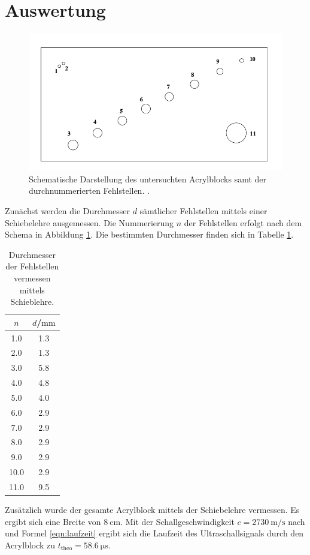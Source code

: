 \section{Auswertung}
\label{sec:Auswertung}
\begin{figure}
  \centering
  \includegraphics{Bilder/fehlstellen.png}
  \caption{Schematische Darstellung des untersuchten Acrylblocks samt der durchnummerierten Fehlstellen. \cite{Anleitung}.}
  \label{fig:fehlstellen}
\end{figure}
Zunächst werden die Durchmesser $d$ sämtlicher Fehlstellen mittels einer Schiebelehre ausgemessen. Die Nummerierung $n$ der Fehlstellen erfolgt nach dem Schema in Abbildung \ref{fig:fehlstellen}. Die bestimmten Durchmesser finden sich in Tabelle \ref{tab:fehlstellen}.
\begin{table}
  \centering
	\caption{Durchmesser der Fehlstellen vermessen mittels Schieblehre.}
	\label{tab:fehlstellen}
	\begin{tabular}{cc}
		\toprule
    $n$ & $d$/$\si{\milli\meter}$ \\
		\midrule
1.0 & 1.3 \\
2.0 & 1.3 \\
3.0 & 5.8 \\
4.0 & 4.8 \\
5.0 & 4.0 \\
6.0 & 2.9 \\
7.0 & 2.9 \\
8.0 & 2.9 \\
9.0 & 2.9 \\
10.0 & 2.9 \\
11.0 & 9.5 \\
\bottomrule
\end{tabular}
\end{table}
Zusätzlich wurde der gesamte Acrylblock mittels der Schiebelehre vermessen. Es ergibt sich eine Breite von ${\SI{8}{\centi\meter}}$. Mit der Schallgeschwindigkeit ${c=\SI{2730}{\meter\per\second}}$ nach \cite{schall} und Formel \eqref{eqn:laufzeit} ergibt sich die Laufzeit des Ultraschallsignals durch den Acrylblock zu ${t_{\mathrm{theo}}=\SI{58.6}{\micro\second}}$.
